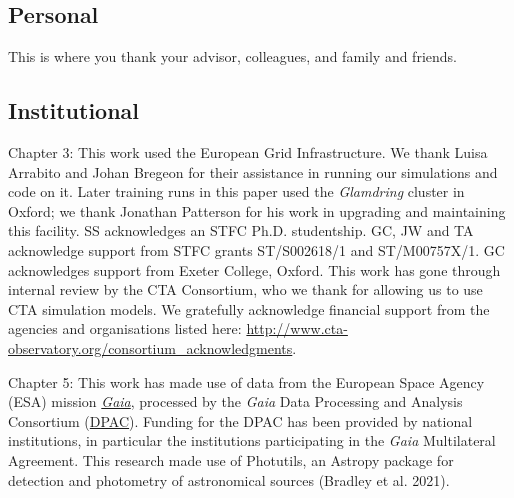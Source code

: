 \subsection*{Personal}

This is where you thank your advisor, colleagues, and family and friends.

\subsection*{Institutional}

Chapter 3: This work used the European Grid Infrastructure. We thank Luisa Arrabito and Johan Bregeon for their assistance in running our simulations and code on it. Later training runs in this paper used the \textit{Glamdring} cluster in Oxford; we thank Jonathan Patterson for his work in upgrading and maintaining this facility. SS acknowledges an STFC Ph.D. studentship. GC, JW and TA acknowledge support from STFC grants ST/S002618/1 and ST/M00757X/1. GC acknowledges support from Exeter College, Oxford. This work has gone through internal review by the CTA Consortium, who we thank for allowing us to use CTA simulation models. We gratefully acknowledge financial support from the agencies and organisations listed here: \url{http://www.cta-observatory.org/consortium\_acknowledgments}.

Chapter 5:
This work has made use of data from the European Space Agency (ESA) mission \href{https://www.cosmos.esa.int/gaia}{\textit{Gaia}}, processed by the \textit{Gaia} Data Processing and Analysis Consortium (\href{https://www.cosmos.esa.int/web/gaia/dpac/consortium}{DPAC}). Funding for the DPAC has been provided by national institutions, in particular the institutions participating in the \textit{Gaia} Multilateral Agreement. This research made use of Photutils, an Astropy package for detection and photometry of astronomical sources (Bradley et al.
2021). 
